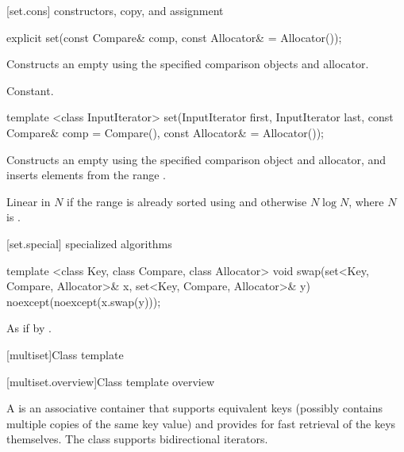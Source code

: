 [set.cons]{ constructors, copy, and assignment}

%
\begin{itemdecl}
explicit set(const Compare& comp, const Allocator& = Allocator());
\end{itemdecl}

\begin{itemdescr}
\pnum
\effects
Constructs an empty  using the specified comparison objects and allocator.

\pnum
\complexity
Constant.
\end{itemdescr}

%
\begin{itemdecl}
template <class InputIterator>
  set(InputIterator first, InputIterator last,
      const Compare& comp = Compare(), const Allocator& = Allocator());
\end{itemdecl}

\begin{itemdescr}
\pnum
\effects
Constructs an empty
using the specified comparison object and allocator,
and inserts elements from the range
.

\pnum
\complexity
Linear in $N$ if the range
is already sorted using 
and otherwise $N \log{N}$,
where $N$ is
.
\end{itemdescr}

[set.special]{ specialized algorithms}

%
\begin{itemdecl}
template <class Key, class Compare, class Allocator>
  void swap(set<Key, Compare, Allocator>& x,
            set<Key, Compare, Allocator>& y)
    noexcept(noexcept(x.swap(y)));
\end{itemdecl}

\begin{itemdescr}
\pnum
\effects
As if by .
\end{itemdescr}

[multiset]{Class template }

[multiset.overview]{Class template  overview}

\pnum
{}%
A
is an associative container that supports equivalent keys (possibly contains multiple copies of
the same key value) and provides for fast retrieval of the keys themselves.
The
 class
supports bidirectional iterators.

